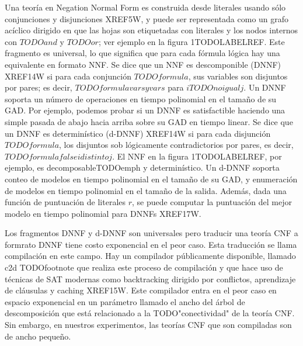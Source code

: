 \documentclass{article}
\begin{document}
Una teoría en Negation Normal Form es construida desde literales usando sólo
conjunciones y disjunciones XREF5W, y puede ser representada como un grafo
acíclico dirigido en que las hojas son etiquetadas con literales y los nodos
internos con $TODOand$ y $TODOor$; ver ejemplo en la figura  1TODOLABELREF. Este
fragmento es universal, lo que significa que para cada fórmula lógica hay una
equivalente en formato NNF. Se dice que un NNF es descomponible (DNNF) XREF14W
si para cada conjunción $TODOformula$, sus variables son disjuntos por pares; es
decir, $TODO formula vars y vars$ para $i TODOnoigual j$. Un DNNF soporta un
número de operaciones en tiempo polinomial en el tamaño de su GAD. Por ejemplo,
podemos probar si un DNNF es satisfactible haciendo una simple pasada de abajo
hacia arriba sobre su GAD en tiempo linear. Se dice que un DNNF es
determinístico (d-DNNF) XREF14W si para cada disjunción $TODOformula$, los
disjuntos sob lógicamente contradictorios por pares, es decir, $TODO formula
false idistintoj$. El NNF en la figura 1TODOLABELREF, por ejemplo, es
decomposableTODOemph y determinístico. Un d-DNNF soporta conteo de modelos en
tiempo polinomial en el tamaño de su GAD, y enumeración de modelos en tiempo
polinomial en el tamaño de la salida. Además, dada una función de puntuación de
literales $r$, se puede computar la puntuación del mejor modelo en tiempo
polinomial para DNNFs XREF17W.

Los fragmentos DNNF y d-DNNF son universales pero traducir una teoría CNF a
formrato DNNF tiene costo exponencial en el peor caso. Esta traducción se
llama compilación en este campo. Hay un compilador públicamente disponible,
llamado c2d TODOfootnote que realiza este proceso de compilación y que hace uso
de técnicas de SAT modernas como backtracking dirigido por conflictos,
aprendizaje de cláusulas y caching XREF15W. Este compilador entra en el peor
caso en espacio exponencial en un parámetro llamado el ancho del árbol de
descomposición que está relacionado a la TODO"conectividad" de la teoría CNF.
Sin embargo, en nuestros experimentos, las teorías CNF que son compiladas son de
ancho pequeño.
\end{document}

